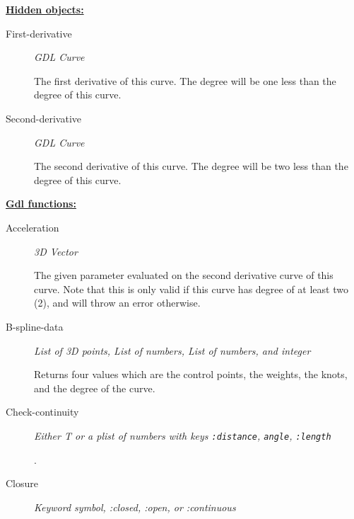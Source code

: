 \documentclass [11pt]{book}
\begin{document}
\begin{itemize}
\textbf{
\underline{Hidden objects:}}

\begin{description}

\item [First-derivative]
\emph{GDL Curve}

 The first derivative of this curve. The degree will be one less than the degree of this curve.




\item [Second-derivative]
\emph{GDL Curve}

 The second derivative of this curve. The degree will be two less than the degree of this curve.




\end{description}






\textbf{
\underline{Gdl functions:}}

\begin{description}

\item [Acceleration]
\emph{3D Vector}

 The given parameter evaluated on the second derivative curve of this curve. Note that this is
only valid if this curve has degree of at least two (2), and will throw an error otherwise.




\item [B-spline-data]
\emph{List of 3D points, List of numbers, List of numbers, and integer}

 Returns four values which are
the control points, the weights, the knots, and the degree of the curve.




\item [Check-continuity]
\emph{Either T or a plist of numbers with keys \texttt{:distance}, \texttt{angle}, \texttt{:length}}

.




\item [Closure]
\emph{Keyword symbol, :closed, :open, or :continuous}






\end{description}
\end{itemize}
\end{document}
